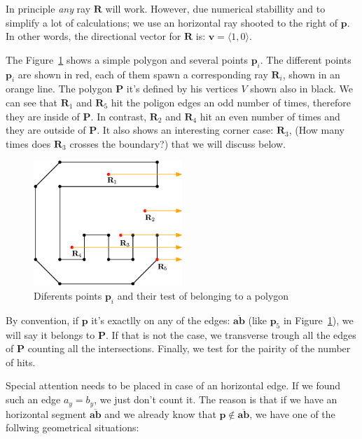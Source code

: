In principle \emph{any} ray $\mathbf{R}$ will work.
However, due numerical stabillity and to simplify a lot of calculations; we use an horizontal ray shooted to the right of $\mathbf{p}$. In other words, the directional vector for $\mathbf{R}$ is: $\mathbf{v} = \langle 1, 0 \rangle$.

The Figure~\ref{fig:polygonTest} shows a simple polygon and several points $\mathbf{p}_i$.
The different points $\mathbf{p}_i$ are shown in red, each of them spawn a corresponding ray $\mathbf{R}_i$, shown in an orange line.
The polygon $\mathbf{P}$ it's defined by his vertices $V$ shown also in black.
We can see that $\mathbf{R}_1$ and $\mathbf{R}_5$ hit the poligon edges an odd number of times, therefore they are inside of $\mathbf{P}$.
In contrast, $\mathbf{R}_2$ and $\mathbf{R}_4$ hit an even number of times and they are outside of $\mathbf{P}$.
It also shows an interesting corner case: $\mathbf{R}_3$, (How many times does $\mathbf{R}_3$ crosses the boundary?) that we will discuss below.

\begin{figure}[htb]
  \centering
  \includegraphics[width=0.50\textwidth]{img/polygonTest}
  \caption{Diferents points $\mathbf{p}_i$ and their test of belonging to a polygon}
  \label{fig:polygonTest}
\end{figure}

By convention, if $\mathbf{p}$ it's exactlly on any of the edges: $\overline{\mathbf{a}\mathbf{b}}$ (like $\mathbf{p}_5$ in Figure~\ref{fig:polygonTest}), we will say it belongs to $\mathbf{P}$.
If that is not the case, we transverse trough all the edges of $\mathbf{P}$ counting all the intersections.
Finally, we test for the pairity of the number of hits.

Special attention needs to be placed in case of an horizontal edge.
If we found such an edge $a_y = b_y$, we just don't count it.
The reason is that if we have an horizontal segment $\overline{\mathbf{a}\mathbf{b}}$ and we already know that $\mathbf{p} \notin\overline{\mathbf{a}\mathbf{b}}$, we have one of the follwing geometrical situations:

